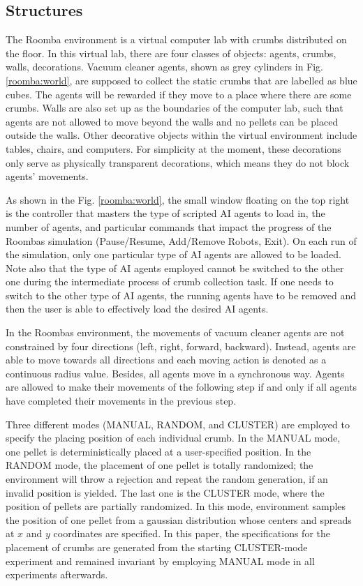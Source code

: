 \documentclass[conference]{IEEEtran}
\begin{document}
\subsection{Structures}
The Roomba environment is a virtual computer lab with crumbs distributed on
the floor.
In this virtual lab, there are four classes of objects: agents, crumbs, walls,
decorations. 
Vacuum cleaner agents, shown as grey cylinders in Fig. \ref{roomba:world}, are
supposed to collect the static crumbs that are labelled as blue cubes.  The
agents will be rewarded if they move to a place where there are some crumbs. 
Walls are also set up as the boundaries of the computer lab, such that
agents are not allowed to move beyond the walls and no pellets can be placed
outside the walls.
Other decorative objects within the virtual environment include tables, chairs, and
computers. For simplicity at the moment, these decorations only serve as
physically transparent decorations, which means they do not block agents'
movements.

As shown in the Fig. \ref{roomba:world}, the small window floating on the top right
is the controller that masters the type of scripted AI agents to load in, the
number of agents, and particular commands that impact the progress of the
Roombas simulation (Pause/Resume, Add/Remove Robots, Exit). On each run of the
simulation, only one particular type of AI agents are allowed to be loaded.
Note also that the type of AI agents employed cannot be switched to the other
one during the intermediate process of crumb collection task. 
If one needs to switch to the other type of AI agents, the running agents have
to be removed and then the user is able to effectively load the desired AI agents.

In the Roombas environment, the movements of vacuum cleaner agents are not
constrained by four directions (left, right, forward, backward). Instead,
agents are able to move towards all directions and each moving action is
denoted as a continuous radius value. Besides, all agents move in a
synchronous way. Agents are allowed to make their movements of the following
step if and only if all agents have completed their movements in the previous step.

Three different modes (MANUAL, RANDOM, and CLUSTER) are employed to specify
the placing position of each individual crumb.
In the MANUAL mode, one pellet is deterministically placed at a user-specified
position. 
In the RANDOM mode, the placement of one pellet is totally randomized; the
environment will throw a rejection and repeat the random generation, if an
invalid position is yielded. The last one is the CLUSTER mode, where the
position of pellets are partially randomized. In this mode,
environment samples the position of one pellet from a gaussian distribution
whose centers and spreads at $x$ and $y$ coordinates are specified. 
In this paper, the specifications for the placement of crumbs are generated
from the starting CLUSTER-mode experiment and remained invariant by
employing MANUAL mode in all experiments afterwards.
\end{document}
